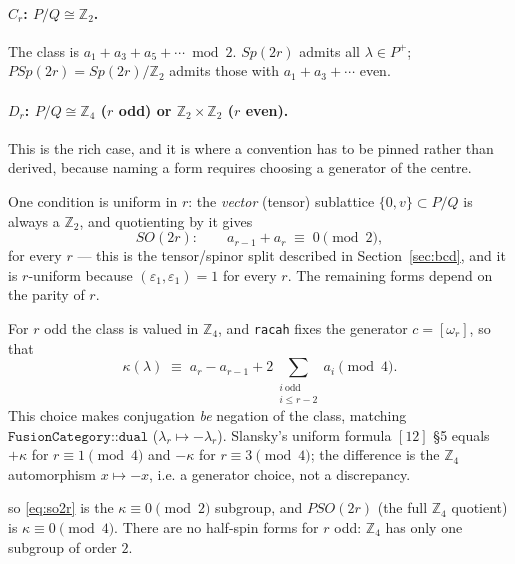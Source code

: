 \documentclass[11pt,a4paper]{article}
\theoremstyle{plain}
\theoremstyle{definition}
\newcommand{\ZZ}{\mathbb{Z}}
\newcommand{\code}[1]{\texttt{#1}}
\begin{document}
\paragraph{$C_r$: $P/Q\cong\ZZ_2$.} The class is
$a_1+a_3+a_5+\cdots \bmod 2$. $Sp(2r)$ admits all $\lambda\in P^+$;
$PSp(2r)=Sp(2r)/\ZZ_2$ admits those with $a_1+a_3+\cdots$ even.

\paragraph{$D_r$: $P/Q\cong\ZZ_4$ ($r$ odd) or $\ZZ_2\times\ZZ_2$ ($r$ even).}
This is the rich case, and it is where a convention has to be pinned rather
than derived, because naming a form requires choosing a generator of the
centre.

One condition is uniform in $r$: the \emph{vector} (tensor) sublattice
$\{0,v\}\subset P/Q$ is always a $\ZZ_2$, and quotienting by it gives
\begin{equation}\label{eq:so2r}
  SO(2r):\qquad a_{r-1} + a_r \;\equiv\; 0 \pmod 2 ,
\end{equation}
for every $r$ --- this is the tensor/spinor split described in
Section~\ref{sec:bcd},
and it is $r$-uniform because $(\varepsilon_1,\varepsilon_1)=1$ for every $r$.
The remaining forms depend on the parity of $r$.

For $r$ odd the class is valued in $\ZZ_4$, and \code{racah} fixes the
generator $c=[\omega_r]$, so that
\begin{equation}\label{eq:d4class}
  \kappa(\lambda) \;\equiv\;
    a_r - a_{r-1} + 2\!\!\sum_{\substack{i \ \mathrm{odd} \\ i \le r-2}}\!\! a_i
  \pmod 4 .
\end{equation}
This choice makes conjugation \emph{be} negation of the class, matching
$\code{FusionCategory::dual}$ ($\lambda_r\mapsto-\lambda_r$). Slansky's uniform
formula $[12]$ \S5 equals $+\kappa$ for $r\equiv 1 \pmod 4$ and $-\kappa$ for
$r\equiv 3\pmod 4$; the difference is the $\ZZ_4$ automorphism $x\mapsto -x$,
i.e. a generator choice, not a discrepancy.

so \eqref{eq:so2r} is the $\kappa\equiv 0\pmod 2$ subgroup, and $PSO(2r)$ (the
full $\ZZ_4$ quotient) is $\kappa\equiv 0 \pmod 4$. There are no half-spin
forms for $r$ odd: $\ZZ_4$ has only one subgroup of order $2$.
\end{document}

